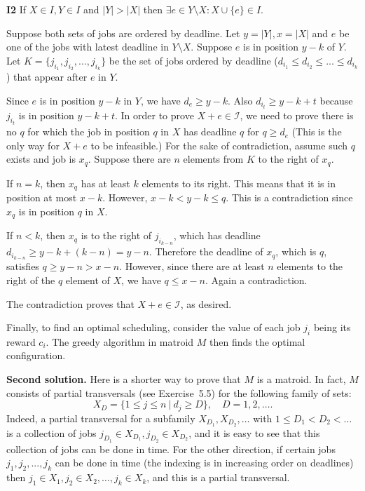 \documentclass[12pt]{article}
\newcommand{\I}{\mathcal I}
\begin{document}
\begin{enumerate}
{\bf I2} If $X \in I, Y \in I$ and $|Y| > |X|$ then $\exists e \in Y\setminus X : X \cup \{e\} \in I$.
	
Suppose both sets of jobs are ordered by deadline. Let $y  = |Y|, x = |X|$ and $e$ be one of the jobs with latest deadline in $Y \setminus X$. Suppose $e$ is in position $y-k$ of $Y$. Let $K = \{ j_{i_1}, j_{i_2}, ..., j_{i_k}\}$ be the set of jobs ordered by deadline ($d_{i_1} \leq d_{i_2} \leq ... \leq d_{i_k}$) that appear after $e$ in $Y$.
	
Since $e$ is in position $y-k$ in $Y$, we have $d_e \geq y-k$. Also $d_{i_t} \geq y - k + t$ because $j_{i_t}$ is in position $y - k + t$. In order to prove $X+e\in\I$, we need to prove there is no $q$ for which the job in position $q$ in $X$ has deadline $q$ for $q \geq d_e$ (This is the only way for $X+e$ to be infeasible.) For the sake of contradiction, assume such $q$ exists and job is $x_q$. Suppose there are $n$ elements from $K$ to the right of $x_q$.
	
If $n = k$, then $x_q$ has at least $k$ elements to its right. This means that it is in position at most $x-k$. However, $x-k < y-k \leq q$. This is a contradiction since $x_q$ is in position $q$ in $X$.
	
If $n < k$, then $x_q$ is to the right of $j_{i_{k-n}}$, which has deadline $d_{i_{k-n}} \geq y - k + (k-n) = y-n$. Therefore the deadline of $x_q$, which is $q$, satisfies $q \geq y-n > x-n$. However, since there are at least $n$ elements to the right of the $q$ element of $X$, we have $q \leq x-n$. Again a contradiction.
	
The contradiction proves that $X + e\in\I$, as desired.
	
Finally, to find an optimal scheduling, consider the value of each job $j_i$ being its reward $c_i$.
The greedy algorithm in matroid $M$ then finds the optimal configuration.

{\bf Second solution.} Here is a shorter way to prove that $M$ is a matroid. In fact, $M$ consists of partial transversals (see Exercise~5.5) for the following family of sets:
\[
X_D = \{1 \le j \le n ~\vert~ d_j \ge D\}, \quad D = 1, 2, \ldots.
\]
Indeed, a partial transversal for a subfamily $X_{D_1}, X_{D_2}, \ldots$ with $1 \le D_1 < D_2 < \ldots$ is a collection of jobs $j_{D_1} \in X_{D_1}, j_{D_2} \in X_{D_2}$, and it is easy to see that this collection of jobs can be done in time. For the other direction, if certain jobs $j_1, j_2, ..., j_k$ can be done in time (the indexing is in increasing order on deadlines) then $j_1 \in X_1, j_2 \in X_2, \ldots, j_k \in X_k$, and this is a partial transversal.



\end{enumerate}
\end{document}
